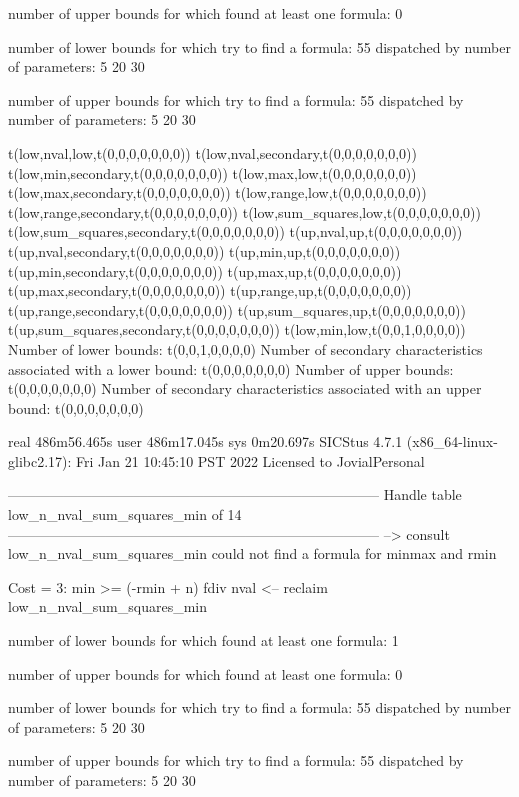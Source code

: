 number of upper bounds for which found at least one formula: 0

number of lower bounds for which try to find a formula: 55
dispatched by number of parameters: 5  20  30

number of upper bounds for which try to find a formula: 55
dispatched by number of parameters: 5  20  30

t(low,nval,low,t(0,0,0,0,0,0,0))
t(low,nval,secondary,t(0,0,0,0,0,0,0))
t(low,min,secondary,t(0,0,0,0,0,0,0))
t(low,max,low,t(0,0,0,0,0,0,0))
t(low,max,secondary,t(0,0,0,0,0,0,0))
t(low,range,low,t(0,0,0,0,0,0,0))
t(low,range,secondary,t(0,0,0,0,0,0,0))
t(low,sum_squares,low,t(0,0,0,0,0,0,0))
t(low,sum_squares,secondary,t(0,0,0,0,0,0,0))
t(up,nval,up,t(0,0,0,0,0,0,0))
t(up,nval,secondary,t(0,0,0,0,0,0,0))
t(up,min,up,t(0,0,0,0,0,0,0))
t(up,min,secondary,t(0,0,0,0,0,0,0))
t(up,max,up,t(0,0,0,0,0,0,0))
t(up,max,secondary,t(0,0,0,0,0,0,0))
t(up,range,up,t(0,0,0,0,0,0,0))
t(up,range,secondary,t(0,0,0,0,0,0,0))
t(up,sum_squares,up,t(0,0,0,0,0,0,0))
t(up,sum_squares,secondary,t(0,0,0,0,0,0,0))
t(low,min,low,t(0,0,1,0,0,0,0))
Number of lower bounds:                                             t(0,0,1,0,0,0,0)
Number of secondary characteristics associated with a lower bound:  t(0,0,0,0,0,0,0)
Number of upper bounds:                                             t(0,0,0,0,0,0,0)
Number of secondary characteristics associated with an upper bound: t(0,0,0,0,0,0,0)

real	486m56.465s
user	486m17.045s
sys	0m20.697s
SICStus 4.7.1 (x86_64-linux-glibc2.17): Fri Jan 21 10:45:10 PST 2022
Licensed to JovialPersonal


--------------------------------------------------------------------------------
Handle table low_n_nval_sum_squares_min of 14
--------------------------------------------------------------------------------
--> consult low_n_nval_sum_squares_min
could not find a formula for minmax and rmin

Cost =  3:  min >= (-rmin + n) fdiv nval %
<-- reclaim low_n_nval_sum_squares_min

number of lower bounds for which found at least one formula: 1

number of upper bounds for which found at least one formula: 0

number of lower bounds for which try to find a formula: 55
dispatched by number of parameters: 5  20  30

number of upper bounds for which try to find a formula: 55
dispatched by number of parameters: 5  20  30


